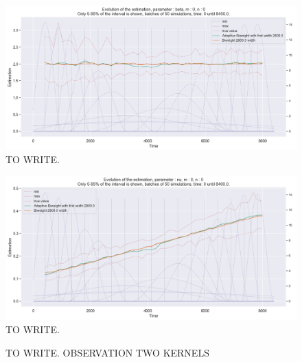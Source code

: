 \begin{figure}
\centering
\includegraphics[width = 0.90 \textwidth]{../imag/chap3/1/E.png}
\caption{TO WRITE.}
\label{fig:first_estimate_1_beta}
\end{figure}

\begin{figure}
\centering
\includegraphics[width = 0.90 \textwidth]{../imag/chap3/1/F.png}
\caption{TO WRITE.}
\label{fig:first_estimate_1_nu}
\end{figure}

















\begin{figure}
\centering
{} 
\caption{TO WRITE. OBSERVATION TWO KERNELS}
\label{fig:TEST}
\end{figure}

